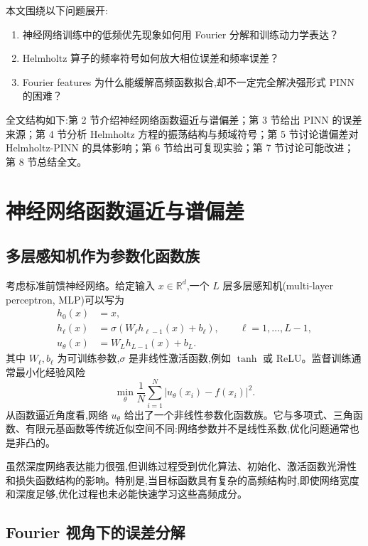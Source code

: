 \documentclass[12pt,hyperref,a4paper,UTF8,twoside]{ctexart}
\newcommand{\R}{\mathbb R}
\begin{document}
本文围绕以下问题展开:
\begin{enumerate}[label=(\arabic*)]
    \item 神经网络训练中的低频优先现象如何用 Fourier 分解和训练动力学表达？
    \item Helmholtz 算子的频率符号如何放大相位误差和频率误差？
    \item Fourier features 为什么能缓解高频函数拟合,却不一定完全解决强形式 PINN 的困难？
\end{enumerate}
全文结构如下:第 2 节介绍神经网络函数逼近与谱偏差；第 3 节给出 PINN 的误差来源；第 4 节分析 Helmholtz 方程的振荡结构与频域符号；第 5 节讨论谱偏差对 Helmholtz-PINN 的具体影响；第 6 节给出可复现实验；第 7 节讨论可能改进；第 8 节总结全文。

\section{神经网络函数逼近与谱偏差}

\subsection{多层感知机作为参数化函数族}

考虑标准前馈神经网络。给定输入 $x\in\R^d$,一个 $L$ 层多层感知机(multi-layer perceptron, MLP)可以写为
\begin{equation}\label{eq:mlp}
\begin{aligned}
    h_0(x)&=x,\\
    h_\ell(x)&=\sigma(W_\ell h_{\ell-1}(x)+b_\ell),\qquad \ell=1,\dots,L-1,\\
    u_\theta(x)&=W_Lh_{L-1}(x)+b_L.
\end{aligned}
\end{equation}
其中 $W_\ell,b_\ell$ 为可训练参数,$\sigma$ 是非线性激活函数,例如 $\tanh$ 或 ReLU。监督训练通常最小化经验风险
\begin{equation}\label{eq:empirical-risk}
    \min_\theta \frac1N\sum_{i=1}^N |u_\theta(x_i)-f(x_i)|^2.
\end{equation}
从函数逼近角度看,网络 $u_\theta$ 给出了一个非线性参数化函数族。它与多项式、三角函数、有限元基函数等传统近似空间不同:网络参数并不是线性系数,优化问题通常也是非凸的。

虽然深度网络表达能力很强,但训练过程受到优化算法、初始化、激活函数光滑性和损失函数结构的影响。特别是,当目标函数具有复杂的高频结构时,即使网络宽度和深度足够,优化过程也未必能快速学习这些高频成分。

\subsection{Fourier 视角下的误差分解}
\end{document}
